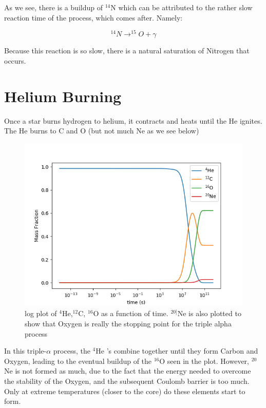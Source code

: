 \documentclass[manuscript]{aastex62}
\begin{document}
As we see, there is a buildup of $^{14}$N which can be attributed to the rather slow reaction time of the process, which comes after. Namely:

\begin{equation}
^{14}N \rightarrow ^{15}O + \gamma
\end{equation}

Because this reaction is so slow, there is a natural saturation of Nitrogen that occurs. 

\section{Helium Burning} \label{sec:He}



Once a star burns hydrogen to helium, it contracts and heats until the He
ignites.  The He burns to C and O (but not much Ne as we see below)


\begin{figure}[H]
\centering
\includegraphics[scale=0.7]{task2}
\caption{log plot of $^4$He,$^{12}$C, $^{16}$O as a function of time. $^{20]}$Ne is also plotted to show that Oxygen is really the stopping point for the triple alpha process}
\end{figure}


In this triple-$\alpha$ process, the $^4$He 's combine together until they form Carbon and Oxygen, leading to the eventual buildup of the $^{16}$O seen in the plot. However, $^{20}$Ne is not formed as much, due to the fact that the energy needed to overcome the stability of the Oxygen, and the subsequent Coulomb barrier is too much. Only at extreme temperatures (closer to the core) do these elements start to form. 
\end{document}
